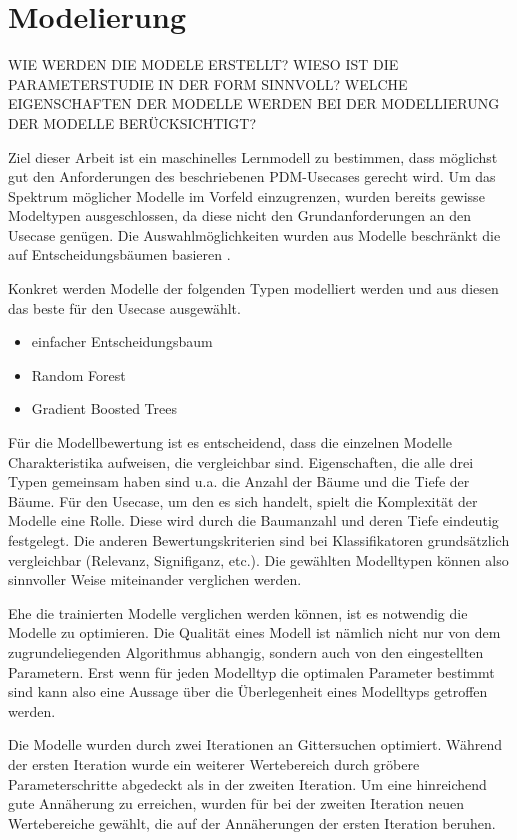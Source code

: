 \section{Modelierung}
\label{sec:modelierung}
WIE WERDEN DIE MODELE ERSTELLT? WIESO IST DIE PARAMETERSTUDIE IN DER FORM SINNVOLL? WELCHE EIGENSCHAFTEN DER MODELLE WERDEN BEI DER MODELLIERUNG DER MODELLE BERÜCKSICHTIGT? 

Ziel dieser Arbeit ist ein maschinelles Lernmodell zu bestimmen, dass möglichst gut den Anforderungen des beschriebenen PDM-Usecases gerecht wird. Um das Spektrum möglicher Modelle im Vorfeld einzugrenzen, wurden bereits gewisse Modeltypen ausgeschlossen, da diese nicht den Grundanforderungen an den Usecase genügen. Die Auswahlmöglichkeiten wurden aus Modelle beschränkt die auf Entscheidungsbäumen basieren .

Konkret werden Modelle der folgenden Typen modelliert werden und aus diesen das beste für den Usecase ausgewählt.
\begin{itemize}
    \item einfacher Entscheidungsbaum
    \item Random Forest
    \item Gradient Boosted Trees
\end{itemize}

Für die Modellbewertung ist es entscheidend, dass die einzelnen Modelle Charakteristika aufweisen, die vergleichbar sind. Eigenschaften, die alle drei Typen gemeinsam haben sind u.a. die Anzahl der Bäume und die Tiefe der Bäume. Für den Usecase, um den es sich handelt, spielt die Komplexität der Modelle eine Rolle. Diese wird durch die Baumanzahl und deren Tiefe eindeutig festgelegt. Die anderen Bewertungskriterien sind bei Klassifikatoren grundsätzlich vergleichbar (Relevanz, Signifiganz, etc.).
Die gewählten Modelltypen können also sinnvoller Weise miteinander verglichen werden. 

Ehe die trainierten Modelle verglichen werden können, ist es notwendig die Modelle zu optimieren. Die Qualität eines Modell ist nämlich nicht nur von dem zugrundeliegenden Algorithmus abhangig, sondern auch von den eingestellten Parametern. Erst wenn für jeden Modelltyp die optimalen Parameter bestimmt sind kann also eine Aussage über die Überlegenheit eines Modelltyps getroffen werden.

Die Modelle wurden durch zwei Iterationen an Gittersuchen optimiert. Während der ersten Iteration wurde ein weiterer Wertebereich durch gröbere Parameterschritte abgedeckt als in der zweiten Iteration. Um eine hinreichend gute Annäherung zu erreichen, wurden für bei der zweiten Iteration neuen Wertebereiche gewählt, die auf der Annäherungen der ersten Iteration beruhen.



